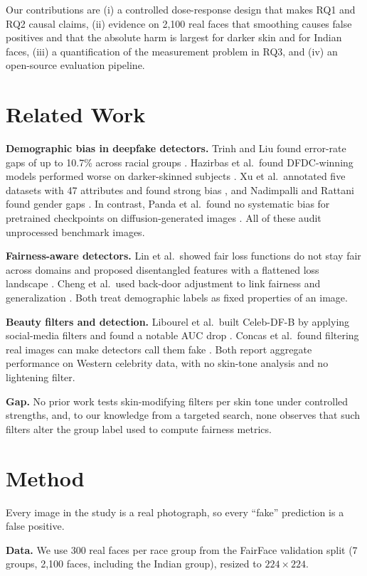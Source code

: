 \documentclass[11pt]{article}
\begin{document}
Our contributions are (i) a controlled dose-response design that makes RQ1 and RQ2 causal claims, (ii) evidence on 2,100 real faces that smoothing causes false positives and that the absolute harm is largest for darker skin and for Indian faces, (iii) a quantification of the measurement problem in RQ3, and (iv) an open-source evaluation pipeline.

\section{Related Work}
\textbf{Demographic bias in deepfake detectors.} Trinh and Liu found error-rate gaps of up to 10.7\% across racial groups \cite{trinh2021}. Hazirbas et al.\ found DFDC-winning models performed worse on darker-skinned subjects \cite{hazirbas2021}. Xu et al.\ annotated five datasets with 47 attributes and found strong bias \cite{xu2022}, and Nadimpalli and Rattani found gender gaps \cite{gbdf2022}. In contrast, Panda et al.\ found no systematic bias for pretrained checkpoints on diffusion-generated images \cite{panda2026}. All of these audit unprocessed benchmark images.

\textbf{Fairness-aware detectors.} Lin et al.\ showed fair loss functions do not stay fair across domains and proposed disentangled features with a flattened loss landscape \cite{lin2024}. Cheng et al.\ used back-door adjustment to link fairness and generalization \cite{cheng2025}. Both treat demographic labels as fixed properties of an image.

\textbf{Beauty filters and detection.} Libourel et al.\ built Celeb-DF-B by applying social-media filters and found a notable AUC drop \cite{libourel2024}. Concas et al.\ found filtering real images can make detectors call them fake \cite{concas2025}. Both report aggregate performance on Western celebrity data, with no skin-tone analysis and no lightening filter.

\textbf{Gap.} No prior work tests skin-modifying filters per skin tone under controlled strengths, and, to our knowledge from a targeted search, none observes that such filters alter the group label used to compute fairness metrics.

\section{Method}
Every image in the study is a real photograph, so every ``fake'' prediction is a false positive.

\textbf{Data.} We use 300 real faces per race group from the FairFace validation split \cite{fairface} (7 groups, 2,100 faces, including the Indian group), resized to $224\times224$.
\end{document}
